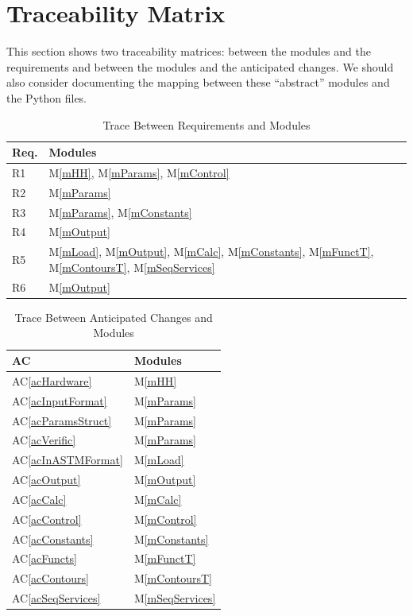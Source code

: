 \documentclass[12pt]{article}
\newcommand{\acref}[1]{AC\ref{#1}}
\newcommand{\mref}[1]{M\ref{#1}}
\begin{document}
\section{Traceability Matrix} \label{SecTM}

This section shows two traceability matrices: between the modules and the
requirements and between the modules and the anticipated changes.  We should
also consider documenting the mapping between these ``abstract'' modules and the
Python files.

\begin{table}[H]
\centering
\begin{tabular}{p{} p{}}
  \toprule
  \textbf{Req.} & \textbf{Modules}\\
  \midrule
  R1 & \mref{mHH}, \mref{mParams}, \mref{mControl}\\
  R2 & \mref{mParams}\\
  R3 & \mref{mParams}, \mref{mConstants}\\
  R4 & \mref{mOutput}\\
  R5 & \mref{mLoad}, \mref{mOutput}, \mref{mCalc}, \mref{mConstants}, \mref{mFunctT},
       \mref{mContoursT}, \mref{mSeqServices}\\
  R6 & \mref{mOutput}\\
  \bottomrule
\end{tabular}
\caption{Trace Between Requirements and Modules}
\label{TblRT}
\end{table}

\begin{table}[H]
\centering
\begin{tabular}{p{} p{}}
\toprule
\textbf{AC} & \textbf{Modules}\\
\midrule
\acref{acHardware} & \mref{mHH}\\
\acref{acInputFormat} & \mref{mParams}\\
\acref{acParamsStruct} & \mref{mParams}\\
\acref{acVerific} & \mref{mParams}\\
\acref{acInASTMFormat} & \mref{mLoad}\\
\acref{acOutput} & \mref{mOutput}\\
\acref{acCalc} & \mref{mCalc}\\
\acref{acControl} & \mref{mControl}\\
\acref{acConstants} & \mref{mConstants}\\
\acref{acFuncts} & \mref{mFunctT}\\
\acref{acContours} & \mref{mContoursT}\\
\acref{acSeqServices} & \mref{mSeqServices}\\
\bottomrule
\end{tabular}
\caption{Trace Between Anticipated Changes and Modules}
\label{TblAC}
\end{table}
\end{document}
